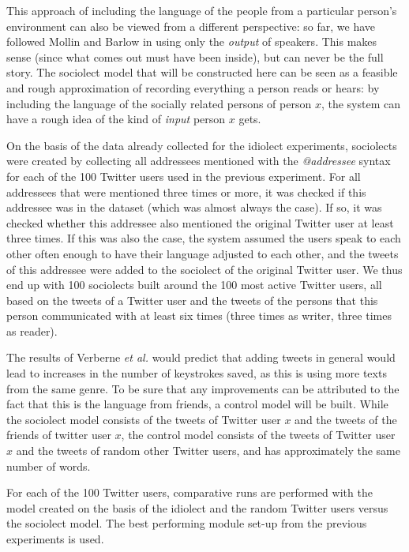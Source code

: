 \documentclass[12pt]{article}
\begin{document}
This approach of including the language of the people from a particular person's environment can also be viewed from a different perspective: so far, we have followed Mollin \citeyear{mollin09} and Barlow\citeyear{barlow10} in using only the \emph{output} of speakers. This makes sense (since what comes out must have been inside), but can never be the full story. The sociolect model that will be constructed here can be seen as a feasible and rough approximation of recording everything a person reads or hears: by including the language of the socially related persons of person $x$, the system can have a rough idea of the kind of \emph{input} person $x$ gets.

On the basis of the data already collected for the idiolect experiments, sociolects were created by collecting all addressees mentioned with the \emph{@addressee} syntax for each of the 100 Twitter users used in the previous experiment. For all addressees that were mentioned three times or more, it was checked if this addressee was in the dataset (which was almost always the case). If so, it was checked whether this addressee also mentioned the original Twitter user at least three times. If this was also the case, the system assumed the users speak to each other often enough to have their language adjusted to each other, and the tweets of this addressee were added to the sociolect of the original Twitter user. We thus end up with 100 sociolects built around the 100 most active Twitter users, all based on the tweets of a Twitter user and the tweets of the persons that this person communicated with at least six times (three times as writer, three times as reader).

The results of Verberne {\em et al.} \citeyear{verberne+12} would predict that adding tweets in general would lead to increases in the number of keystrokes saved, as this is using more texts from the same genre. To be sure that any improvements can be attributed to the fact that this is the language from friends, a control model will be built. While the sociolect model consists of the tweets of Twitter user $x$ and the tweets of the friends of twitter user $x$, the control model consists of the tweets of Twitter user $x$ and the tweets of random other Twitter users, and has approximately the same number of words.

For each of the 100 Twitter users, comparative runs are performed with the model created on the basis of the idiolect and the random Twitter users versus the sociolect model. The best performing module set-up from the previous experiments is used.  
\end{document}
